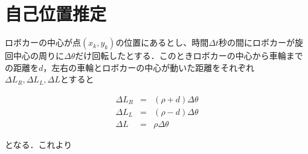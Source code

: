 \documentclass[11pt,a4paper]{jsarticle}
\begin{document}
\section{自己位置推定}
ロボカーの中心が点$(x_k,y_k)$の位置にあるとし、時間$\Delta t$秒の間にロボカーが旋回中心の周りに$\Delta \theta$だけ回転したとする．このときロボカーの中心から車輪までの距離を$d$，左右の車輪とロボカーの中心が動いた距離をそれぞれ$\Delta L_R, \Delta L_L, \Delta L$とすると

\begin{eqnarray}
 \Delta L_R & = & (\rho + d)\Delta \theta \nonumber \\ 
 \Delta L_L & = & (\rho - d)\Delta \theta \nonumber \\
 \Delta L & = &\rho \Delta \theta
\end{eqnarray}

となる．これより
\end{document}
